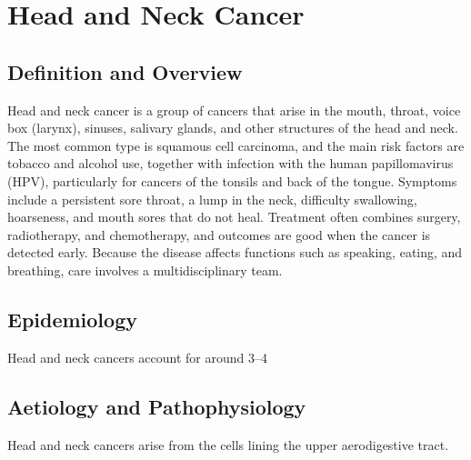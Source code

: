 \chapter{Head and Neck Cancer}

\section*{Definition and Overview}
Head and neck cancer is a group of cancers that arise in the mouth, throat, voice box (larynx), sinuses, salivary glands, and other structures of the head and neck. The most common type is squamous cell carcinoma, and the main risk factors are tobacco and alcohol use, together with infection with the human papillomavirus (HPV), particularly for cancers of the tonsils and back of the tongue. Symptoms include a persistent sore throat, a lump in the neck, difficulty swallowing, hoarseness, and mouth sores that do not heal. Treatment often combines surgery, radiotherapy, and chemotherapy, and outcomes are good when the cancer is detected early. Because the disease affects functions such as speaking, eating, and breathing, care involves a multidisciplinary team.

\section*{Epidemiology}
Head and neck cancers account for around 3--4%

\section*{Aetiology and Pathophysiology}
Head and neck cancers arise from the cells lining the upper aerodigestive tract.

